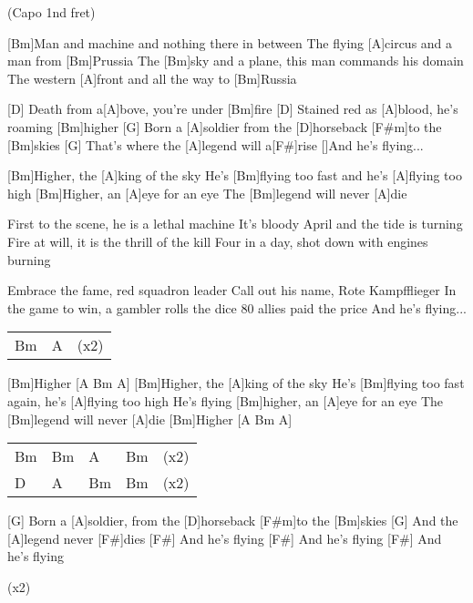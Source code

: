 
{\footnotesize(Capo 1nd fret)}


\begin{guitar}
	[Bm]Man and machine and nothing there in between
	The flying [A]circus and a man from [Bm]Prussia
	The [Bm]sky and a plane, this man commands his domain
	The western [A]front and all the way to [Bm]Russia
	
	[D] Death from a[A]bove, you're under [Bm]fire
	[D] Stained red as [A]blood, he’s roaming [Bm]higher
	[G] Born a [A]soldier from the [D]horseback [F#m]to the [Bm]skies
	[G] That's where the [A]legend will a[F#]rise
	[]And he's flying...
	
	[Bm]Higher, the [A]king of the sky
	He’s [Bm]flying too fast and he's [A]flying too high
	[Bm]Higher, an [A]eye for an eye
	The [Bm]legend will never [A]die
	
	First to the scene, he is a lethal machine
	It's bloody April and the tide is turning
	Fire at will, it is the thrill of the kill
	Four in a day, shot down with engines burning
	
	Embrace the fame, red squadron leader
	Call out his name, Rote Kampfflieger
	In the game to win, a gambler rolls the dice
	80 allies paid the price
	And he's flying...
	
	 
	\pagebreak
	{\footnotesize\begin{tabular}{l|ll}
			Bm & A & (x2)
	\end{tabular}}
	
	[Bm]Higher [A  Bm A]{}
	[Bm]Higher, the [A]king of the sky
	He's [Bm]flying too fast again, he's [A]flying too high
	He’s flying [Bm]higher, an [A]eye for an eye
	The [Bm]legend will never [A]die
	[Bm]Higher [A  Bm A]
	
	{\footnotesize\begin{tabular}{l|l|l|ll}
			Bm & Bm & A & Bm & (x2)\\
			D & A & Bm & Bm & (x2)
	\end{tabular}}
	
	[G] Born a [A]soldier, from the [D]horseback [F#m]to the [Bm]skies
	[G] And the [A]legend never [F#]dies
	[F#] And he’s flying
	[F#] And he’s flying
	[F#] And he’s flying
	
	  (x2)
\end{guitar}